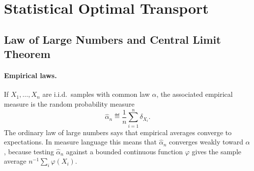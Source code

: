 \section{Statistical Optimal Transport}
\label{sec-statistical-ot}
\subsection{Law of Large Numbers and Central Limit Theorem}
\label{sec-law-large-numbers-clt}
\label{sec-quantitative-clt}
\paragraph{Empirical laws.}
If \(X_1,\ldots,X_n\) are i.i.d.\ samples with common law \(\alpha\), the associated empirical measure is the random probability measure
\begin{equation}\label{eq-empirical-law-alpha-n}
\hat\alpha_n \eqdef \frac1n\sum_{i=1}^n\delta_{X_i}.
\end{equation}
The ordinary law of large numbers says that empirical averages converge to expectations. In measure language this means that \(\hat\alpha_n\) converges weakly toward \(\alpha\), because testing \(\hat\alpha_n\) against a bounded continuous function \(\varphi\) gives the sample average \(n^{-1}\sum_i\varphi(X_i)\).

